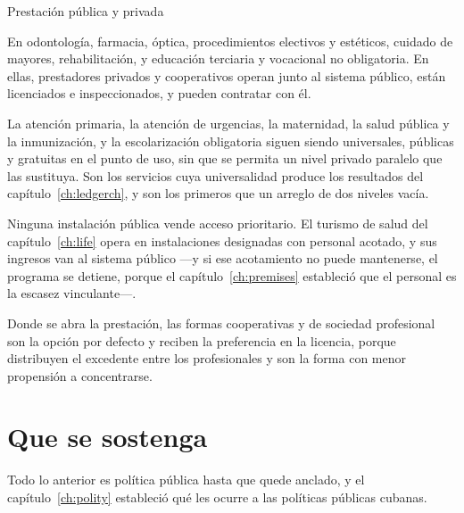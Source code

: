 \begin{design}{Prestación pública y privada}
\label{d:delivery}
\begin{rules}
 En odontología, farmacia, óptica, procedimientos
electivos y estéticos, cuidado de mayores, rehabilitación, y educación terciaria y
vocacional no obligatoria. En ellas, prestadores privados y cooperativos operan junto al
sistema público, están licenciados e inspeccionados, y pueden contratar con él.

 La atención primaria, la atención de urgencias, la
maternidad, la salud pública y la inmunización, y la escolarización obligatoria siguen
siendo universales, públicas y gratuitas en el punto de uso, sin que se permita un
nivel privado paralelo que las sustituya. Son los servicios cuya universalidad produce
los resultados del capítulo~\ref{ch:ledgerch}, y son los primeros que un arreglo de dos
niveles vacía.

 Ninguna instalación pública vende acceso prioritario. El
turismo de salud del capítulo~\ref{ch:life} opera en instalaciones designadas con
personal acotado, y sus ingresos van al sistema público ---y si ese acotamiento no puede
mantenerse, el programa se detiene, porque el capítulo~\ref{ch:premises} estableció que
el personal es la escasez vinculante---.

 Donde se abra la prestación, las formas cooperativas y de
sociedad profesional son la opción por defecto y reciben la preferencia en la licencia,
porque distribuyen el excedente entre los profesionales y son la forma con menor
propensión a concentrarse.
\end{rules}
\end{design}

\section{Que se sostenga}

Todo lo anterior es política pública hasta que quede anclado, y el
capítulo~\ref{ch:polity} estableció qué les ocurre a las políticas públicas cubanas.

